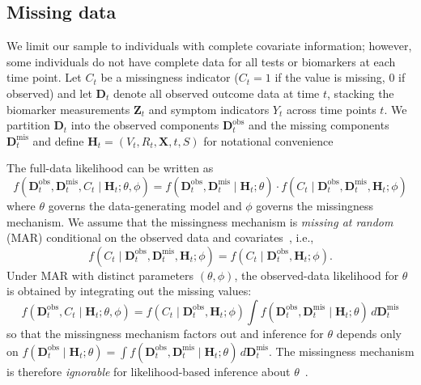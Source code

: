 \documentclass[12pt]{article}
\begin{document}
\subsection{Missing data} 
We limit our sample to individuals with complete covariate information; however, some individuals do not have complete data for all tests or biomarkers at each time point. Let $C_t$ be a missingness indicator ($C_t = 1$ if the value is missing, $0$ if observed) and let $\mathbf{D}_t$ denote all observed outcome data at time $t$, stacking the biomarker measurements $\mathbf{Z}_{t}$ and symptom indicators $Y_{t}$ across time points $t$. We partition $\mathbf{D}_t$ into the observed components $\mathbf{D}^{\text{obs}}_t$ and the missing components $\mathbf{D}^{\text{mis}}_t$ and define $\mathbf{H}_t = (V_t, R_t, \mathbf{X}, t, S)$ for notational convenience

The full-data likelihood can be written as
\begin{equation*}
    f(\mathbf{D}^{\text{obs}}_t, \mathbf{D}^{\text{mis}}_t, C_t \mid \mathbf{H}_t; \theta, \phi) = f(\mathbf{D}^{\text{obs}}_t, \mathbf{D}^{\text{mis}}_t \mid \mathbf{H}_t; \theta) \cdot f(C_t \mid \mathbf{D}^{\text{obs}}_t, \mathbf{D}^{\text{mis}}_t, \mathbf{H}_t; \phi)
\end{equation*}
where $\theta$ governs the data-generating model and $\phi$ governs the missingness mechanism. We assume that the missingness mechanism is \emph{missing at random} (MAR) conditional on the observed data and covariates~\cite{rubin1976inference}, i.e.,
\begin{equation*}
    f(C_t \mid \mathbf{D}^{\text{obs}}_t, \mathbf{D}^{\text{mis}}_t, \mathbf{H}_t; \phi) = f(C_t \mid \mathbf{D}^{\text{obs}}_t, \mathbf{H}_t; \phi).
\end{equation*}
Under MAR with distinct parameters $(\theta, \phi)$, the observed-data likelihood for $\theta$ is obtained by integrating out the missing values:
\begin{equation*}
    f(\mathbf{D}^{\text{obs}}_t, C_t \mid \mathbf{H}_t; \theta, \phi) = f(C_t \mid \mathbf{D}^{\text{obs}}_t, \mathbf{H}_t; \phi) \int f(\mathbf{D}^{\text{obs}}_t, \mathbf{D}^{\text{mis}}_t \mid \mathbf{H}_t; \theta)\, d\mathbf{D}^{\text{mis}}_t
\end{equation*}
so that the missingness mechanism factors out and inference for $\theta$ depends only on $f(\mathbf{D}^{\text{obs}}_t \mid \mathbf{H}_t; \theta) = \int f(\mathbf{D}^{\text{obs}}_t, \mathbf{D}^{\text{mis}}_t \mid \mathbf{H}_t; \theta)\, d\mathbf{D}^{\text{mis}}_t$. The missingness mechanism is therefore \emph{ignorable} for likelihood-based inference about $\theta$~\cite{little2019statistical}.
\end{document}

